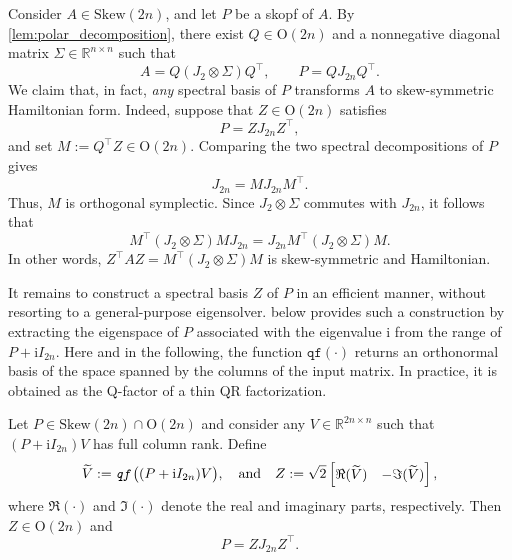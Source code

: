 \documentclass[final,onefignum,onetabnum,dvipsnames]{siamart251216}
\numberwithin{algorithm}{section}
\numberwithin{equation}{section}
\begin{document}
Consider $A\in\mathrm{Skew}(2n)$, and let $P$ be a skopf of $A$. By \cref{lem:polar_decomposition}, there exist $Q\in\mathrm{O}(2n)$ and a nonnegative
diagonal matrix $\Sigma\in\mathbb{R}^{n\times n}$ such that
\[
    A = Q(J_2\otimes\Sigma)Q^\top,
    \qquad
    P = QJ_{2n}Q^\top.
\]
We claim that, in fact, \emph{any} spectral basis of $P$ transforms $A$ to
skew-symmetric Hamiltonian form. Indeed, suppose that $Z\in\mathrm{O}(2n)$
satisfies
\[
    P=ZJ_{2n}Z^\top,
\]
and set $M:=Q^\top Z\in\mathrm{O}(2n)$. Comparing the two spectral
decompositions of $P$ gives
\[
    J_{2n}=MJ_{2n}M^\top.
\]
Thus, $M$ is orthogonal symplectic. Since $J_2\otimes\Sigma$ commutes with $J_{2n}$,
it follows that
\[
    M^\top (J_2\otimes\Sigma) M J_{2n}
    =J_{2n} M^\top (J_2\otimes\Sigma) M.
\]
In other words,
$Z^\top A Z=M^\top (J_2\otimes\Sigma) M$
is skew-symmetric and Hamiltonian.

It remains to construct a spectral basis $Z$ of $P$ in an efficient manner, without
resorting to a general-purpose eigensolver.  below provides such a
construction by extracting the eigenspace of $P$ associated with the
eigenvalue $\mathrm{i}$ from the range of $P+\mathrm{i}I_{2n}$.
Here and in the following, the function $\texttt{qf}(\cdot)$ returns an orthonormal basis of the space spanned by the columns of the input matrix. In practice, it is obtained as the Q-factor of a thin QR factorization.

\begin{theorem} \label{thm:qfactor}
Let $P\in\mathrm{Skew}(2n)\cap\mathrm{O}(2n)$ and consider any
$V\in\mathbb{R}^{2n\times n}$ such that
$(P+\mathrm{i}I_{2n})V$ has full column rank. Define
\[
    \widetilde V:=\text{\emph{\texttt{qf}}}\bigl((P+\mathrm{i}I_{2n})V\bigr), \quad \text{and} \quad
    Z:=\sqrt{2}
    \begin{bmatrix}
        \Re(\widetilde V) & -\Im(\widetilde V)
    \end{bmatrix},
\]
where $\Re(\cdot)$ and $\Im(\cdot)$ denote the real and imaginary parts, respectively.
Then $Z\in\mathrm{O}(2n)$ and
\[
    P=ZJ_{2n}Z^\top.
\]
\end{theorem}
\end{document}
